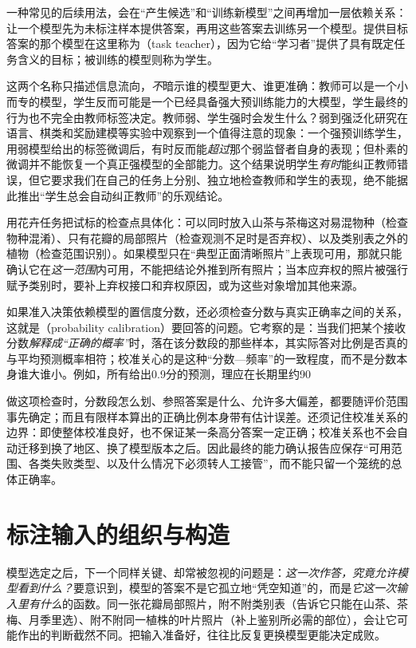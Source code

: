\Needspace{100mm}
一种常见的后续用法，会在“产生候选”和“训练新模型”之间再增加一层依赖关系：让一个模型先为未标注样本提供答案，再用这些答案去训练另一个模型。提供目标答案的那个模型在这里称为（task teacher），因为它给“学习者”提供了具有既定任务含义的目标；被训练的模型则称为学生。

这两个名称只描述信息流向，\emph{不}暗示谁的模型更大、谁更准确：教师可以是一个小而专的模型，学生反而可能是一个已经具备强大预训练能力的大模型，学生最终的行为也不完全由教师标签决定。教师弱、学生强时会发生什么？弱到强泛化研究在语言、棋类和奖励建模等实验中观察到一个值得注意的现象：一个强预训练学生，用弱模型给出的标签微调后，有时反而能\emph{超过}那个弱监督者自身的表现；但朴素的微调并不能恢复一个真正强模型的全部能力。这个结果说明学生\emph{有时}能纠正教师错误，但它要求我们在自己的任务上分别、独立地检查教师和学生的表现，绝不能据此推出“学生总会自动纠正教师”的乐观结论。

用花卉任务把试标的检查点具体化：可以同时放入山茶与茶梅这对易混物种（检查物种混淆）、只有花瓣的局部照片（检查观测不足时是否弃权）、以及类别表之外的植物（检查范围识别）。如果模型只在“典型正面清晰照片”上表现可用，那就只能确认它在\emph{这一范围}内可用，不能把结论外推到所有照片；当本应弃权的照片被强行赋予类别时，要补上弃权接口和弃权原因，或为这些对象增加其他来源。

如果准入决策依赖模型的置信度分数，还必须检查分数与真实正确率之间的关系，这就是（probability calibration）要回答的问题。它考察的是：当我们把某个接收分数\emph{解释成“正确的概率”}时，落在该分数段的那些样本，其实际答对比例是否真的与平均预测概率相符；校准关心的是这种“分数—频率”的一致程度，而不是分数本身谁大谁小。例如，所有给出0.9分的预测，理应在长期里约90%

做这项检查时，分数段怎么划、参照答案是什么、允许多大偏差，都要随评价范围事先确定；而且有限样本算出的正确比例本身带有估计误差。还须记住校准关系的边界：即使整体校准良好，也不保证某一条高分答案一定正确；校准关系也不会自动迁移到换了地区、换了模型版本之后。因此最终的能力确认报告应保存“可用范围、各类失败类型、以及什么情况下必须转人工接管”，而不能只留一个笼统的总体正确率。

\section{标注输入的组织与构造}
\label{sec:knowledge-acquisition-input-organization}

模型选定之后，下一个同样关键、却常被忽视的问题是：\emph{这一次作答，究竟允许模型看到什么？}要意识到，模型的答案不是它孤立地“凭空知道”的，而是\emph{它这一次输入里有什么}的函数。同一张花瓣局部照片，附不附类别表（告诉它只能在山茶、茶梅、月季里选）、附不附同一植株的叶片照片（补上鉴别所必需的部位），会让它可能作出的判断截然不同。把输入准备好，往往比反复更换模型更能决定成败。

